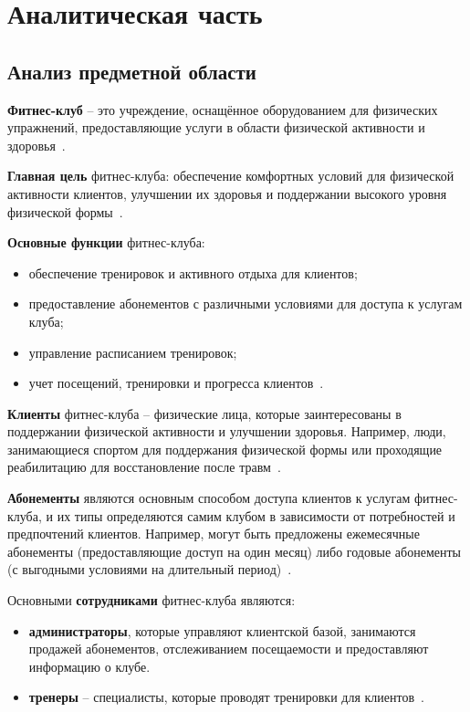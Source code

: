 \section{Аналитическая часть}

\subsection{Анализ предметной области}\label{scene}

\textbf{Фитнес-клуб} -- это учреждение, оснащённое оборудованием для физических упражнений, предоставляющие услуги в области физической активности и здоровья~\cite{IHRSA2019, leonquismondo2020service}. 

\textbf{Главная цель} фитнес-клуба: обеспечение комфортных условий для физической активности клиентов, улучшении их здоровья и поддержании высокого уровня физической формы~\cite{IHRSA2019, leonquismondo2020service, bates2019health}.

\textbf{Основные функции} фитнес-клуба:
\begin{itemize}
	\item обеспечение тренировок и активного отдыха для клиентов;
	\item предоставление абонементов с различными условиями для доступа к услугам клуба;
	\item управление расписанием тренировок;
	\item учет посещений, тренировки и прогресса клиентов~\cite{bates2019health}.
\end{itemize}

\textbf{Клиенты} фитнес-клуба -- физические лица, которые заинтересованы в поддержании физической активности и улучшении здоровья. Например, люди, занимающиеся спортом для поддержания физической формы или проходящие реабилитацию для восстановление после травм~\cite{leonquismondo2020service, bates2019health}.

\textbf{Абонементы} являются основным способом доступа клиентов к услугам фитнес-клуба, и их типы определяются самим клубом в зависимости от потребностей и предпочтений клиентов. Например, могут быть предложены ежемесячные абонементы (предоставляющие доступ на один месяц) либо годовые абонементы (с выгодными условиями на длительный период)~\cite{bates2019health}.

Основными \textbf{сотрудниками} фитнес-клуба являются:
\begin{itemize}
	\item \textbf{администраторы}, которые управляют клиентской базой, занимаются продажей абонементов, отслеживанием посещаемости и предоставляют информацию о клубе.
	
	\item \textbf{тренеры} -- специалисты, которые проводят тренировки для клиентов~\cite{bates2019health}. 
\end{itemize}

